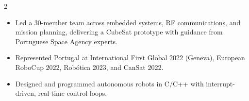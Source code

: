 \documentclass[10pt,a4paper,ragged2e,withhyper]{altacv}
\begin{document}
\begin{paracol}{2}
            \begin{itemize}
                \item Led a 30-member team across embedded systems, RF communications, and mission planning, delivering a CubeSat prototype with guidance from Portuguese Space Agency experts.
            \end{itemize}

            \begin{itemize}
                \item Represented Portugal at International First Global 2022 (Geneva), European RoboCup 2022, Robótica 2023, and CanSat 2022.
                \item Designed and programmed autonomous robots in C/C++ with interrupt-driven, real-time control loops.
            \end{itemize}

    \end{paracol}
\end{document}
